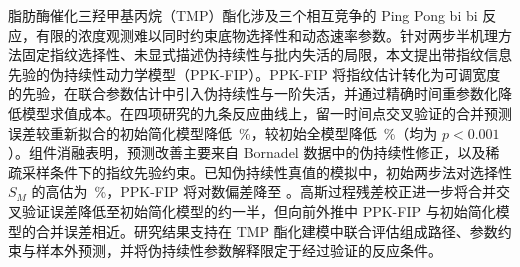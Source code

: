 脂肪酶催化三羟甲基丙烷（TMP）酯化涉及三个相互竞争的 Ping Pong bi bi 反应，有限的浓度观测难以同时约束底物选择性和动态速率参数。针对两步半机理方法固定指纹选择性、未显式描述伪持续性与批内失活的局限，本文提出带指纹信息先验的伪持续性动力学模型（PPK-FIP）。PPK-FIP 将指纹估计转化为可调宽度的先验，在联合参数估计中引入伪持续性与一阶失活，并通过精确时间重参数化降低模型求值成本。在四项研究的九条反应曲线上，留一时间点交叉验证的合并预测误差较重新拟合的初始简化模型降低 \LotoAllRedOrig\,\%，较初始全模型降低 \LotoAllRedFull\,\%（均为 $p<0.001$）。组件消融表明，预测改善主要来自 Bornadel 数据中的伪持续性修正，以及稀疏采样条件下的指纹先验约束。已知伪持续性真值的模拟中，初始两步法对选择性 $S_M$ 的高估为 \SimSMBiasOrigPct\,\%，PPK-FIP 将对数偏差降至 \SimSMBiasNew。高斯过程残差校正进一步将合并交叉验证误差降低至初始简化模型的约一半，但向前外推中 PPK-FIP 与初始简化模型的合并误差相近。研究结果支持在 TMP 酯化建模中联合评估组成路径、参数约束与样本外预测，并将伪持续性参数解释限定于经过验证的反应条件。
